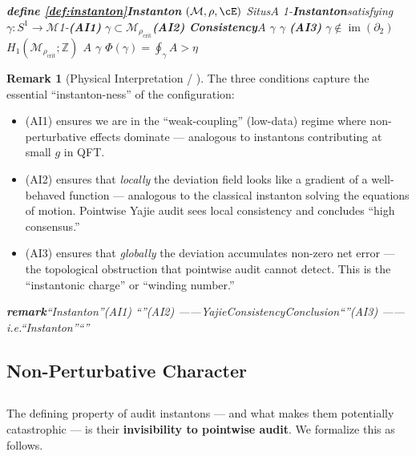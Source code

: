 \documentclass[11pt,a4paper]{article}
\theoremstyle{plain}
\theoremstyle{definition}
\newtheorem{remark}[theorem]{Remark}
\DeclareMathOperator{\im}{im}
\newcommand{\Z}{\mathbb{Z}}
\newcommand{\cM}{\mathcal{M}}
\begin{document}
\bigskip
\noindent
\textit{\textbf{define \ref{def:instanton}Instanton} $(\cM, \rho, \cE)$ Situs$A$ 1-\textbf{Instanton}satisfying $\gamma: S^1 \to \cM$1-\textbf{(AI1) }$\gamma \subset \cM_{\rho_{\text{crit}}}$\textbf{(AI2) Consistency}$A$  $\gamma$  $\gamma$ \textbf{(AI3) }$\gamma \notin \im(\partial_2)$  $H_1(\cM_{\rho_{\text{crit}}}; \Z)$  $A$  $\gamma$ \textbf{}$\Phi(\gamma) = \oint_{\gamma} A > \eta$}

\begin{remark}[Physical Interpretation / ]
The three conditions capture the essential ``instanton-ness'' of the 
configuration:
\begin{itemize}
  \item (AI1) ensures we are in the ``weak-coupling'' (low-data) regime 
        where non-perturbative effects dominate — analogous to instantons 
        contributing at small $g$ in QFT.
  \item (AI2) ensures that \emph{locally} the deviation field looks like 
        a gradient of a well-behaved function — analogous to the classical 
        instanton solving the equations of motion. Pointwise Yajie audit 
        sees local consistency and concludes ``high consensus.''
  \item (AI3) ensures that \emph{globally} the deviation accumulates 
        non-zero net error — the topological obstruction that pointwise 
        audit cannot detect. This is the ``instantonic charge'' or 
        ``winding number.''
\end{itemize}
\end{remark}

\bigskip
\noindent
\textit{\textbf{remark}``Instanton''(AI1) ``''(AI2) \textbf{}——YajieConsistencyConclusion``''(AI3) \textbf{}——i.e.``Instanton''``''}

\subsection{Non-Perturbative Character}
\subsection*{}

The defining property of audit instantons — and what makes them 
potentially catastrophic — is their \textbf{invisibility to pointwise 
audit}. We formalize this as follows.
\end{document}
